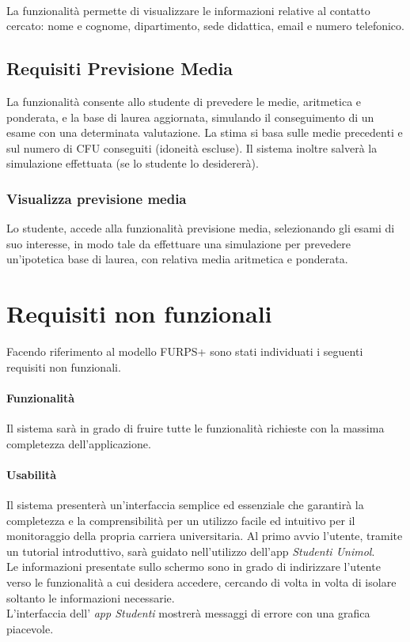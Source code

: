 \paragraph{}
La funzionalità permette di visualizzare le informazioni relative al contatto cercato: nome e cognome, dipartimento, sede didattica, email e numero telefonico.

\subsection{Requisiti Previsione Media}

La funzionalità consente allo studente di prevedere le medie, aritmetica e ponderata, e la base di laurea aggiornata, simulando il conseguimento di un esame con una determinata valutazione. La stima si basa sulle medie precedenti e sul numero di CFU conseguiti (idoneità escluse). Il sistema inoltre salverà la simulazione effettuata (se lo studente lo desidererà).

\subsubsection{Visualizza previsione media}

Lo studente, accede alla funzionalità previsione media, selezionando gli esami di suo interesse, in modo tale da effettuare una simulazione per prevedere un'ipotetica base di laurea, con relativa media aritmetica e ponderata.

\section{Requisiti non funzionali}

Facendo riferimento al modello FURPS+ sono stati individuati i seguenti requisiti
non funzionali.

\paragraph{Funzionalità\\} 
Il sistema sarà in grado di fruire tutte le funzionalità richieste con la massima completezza dell’applicazione.

\paragraph{Usabilità\\} 
Il sistema presenterà un’interfaccia semplice ed essenziale che garantirà la completezza e la comprensibilità per un utilizzo facile ed intuitivo per il monitoraggio della propria carriera universitaria. Al primo avvio l’utente, tramite un tutorial introduttivo, sarà guidato nell’utilizzo dell’app \emph{Studenti Unimol}.\\ 
Le informazioni presentate sullo schermo sono in grado di indirizzare l’utente verso le funzionalità a cui desidera accedere, cercando di volta in volta di isolare soltanto le informazioni necessarie.\\
L'interfaccia dell' \textit{app Studenti} mostrerà messaggi di errore con una grafica piacevole.

